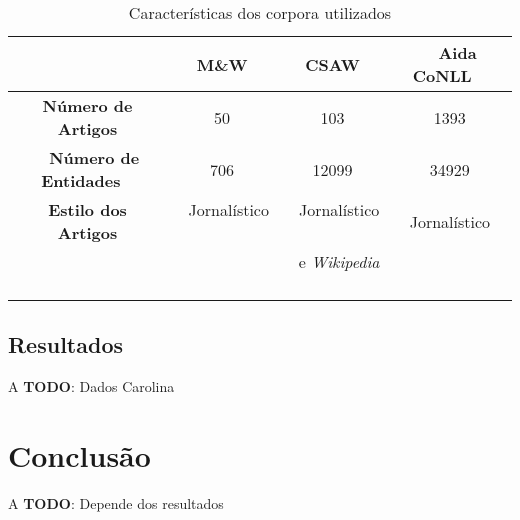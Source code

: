 \documentclass[10pt,a4paper]{llncs}
\newcommand{\todo}[1]{{\color{red}\textsf{\textbf{TODO}}: #1}}
\begin{document}
\begin{table} \label{tab-corpora}
\caption{Características dos corpora utilizados}
\centering
    \begin{tabular}{|c|c|c|c|}
    \hline
    ~                                    & {\bf M\&W} & {\bf CSAW}               & ~ {\bf Aida CoNLL} ~ \\ \hline
    {\bf Número de Artigos}   & 50                    & 103                                 & 1393                        \\ \hline
    ~ {\bf Número de Entidades} ~ & 706                   & 12099                               & 34929                       \\ \hline
    {\bf Estilo dos Artigos}  & ~ Jornalístico ~          & ~ Jornalístico ~                & ~ Jornalístico ~                \\
    ~                                    & ~                     & ~ e {\it Wikipedia} ~ & ~                           \\ \hline
    \end{tabular}
\end{table}

\subsection{Resultados} \label{resultados}
\indent\indent A
\todo{Dados Carolina}

\section{Conclusão} \label{conclusao}
\indent\indent A
\todo{Depende dos resultados}



\end{document}

